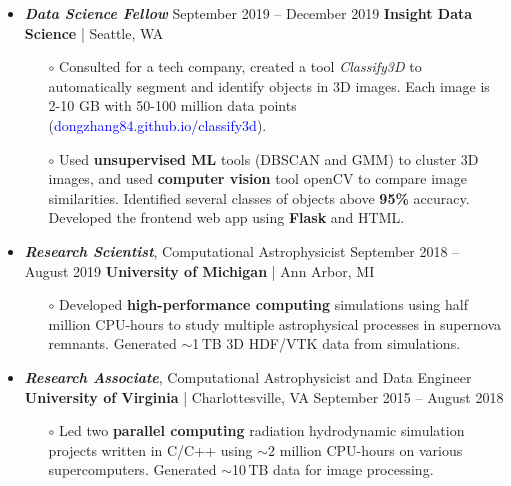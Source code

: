 \documentclass[10pt]{res}
\begin{document}
\begin{resume}
\begin{itemize} [leftmargin=0.0cm]
 \vspace{0.1cm}
 
 
\item{\sl \textbf{Data Science Fellow} } \hfill September 2019 --   December 2019 \newline
 \textbf{Insight Data Science} | Seattle, WA 

 \begin{itemize}[leftmargin=0.35cm]
\item[$\circ$] Consulted for a tech company, created a tool {\sl Classify3D} to automatically segment and identify objects in 3D images. Each image is 2-10 GB with 50-100 million data points (\textcolor{blue}{dongzhang84.github.io/classify3d}). 
\item[$\circ$] Used \textbf{unsupervised ML} tools (DBSCAN and GMM) to cluster 3D images, and used \textbf{computer vision} tool openCV to compare image similarities. Identified several classes of objects above \textbf{95\%} accuracy. Developed the frontend web app using \textbf{Flask} and HTML.
  \end{itemize}

\vspace{0.1cm}

\item 
{\sl \textbf{Research Scientist}}, Computational Astrophysicist  \hfill September 2018 -- August 2019 \newline
\textbf{University of Michigan} | Ann Arbor, MI

 \begin{itemize}[leftmargin=0.35cm]
 \item[$\circ$] Developed \textbf{high-performance computing} simulations using half million CPU-hours to study multiple astrophysical processes in supernova remnants. Generated  $\sim$1\,TB 3D HDF/VTK data from simulations.
  \end{itemize}
  
 \vspace{0.1cm}
 
\item

{\sl \textbf{Research Associate}}, Computational Astrophysicist and Data Engineer  \newline
\textbf{University of Virginia} | Charlottesville, VA \hfill September 2015 -- August 2018 

 \begin{itemize}[leftmargin=0.35cm]
 \item[$\circ$] Led two \textbf{parallel computing} radiation hydrodynamic simulation projects written in C/C++ using $\sim$2 million CPU-hours on various supercomputers. Generated $\sim$10\,TB data for image processing.  
 

\end{itemize}
\end{itemize}
\end{resume}
\end{document}
